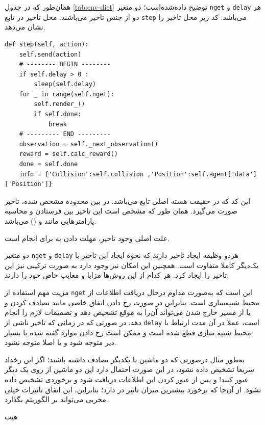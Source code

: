 همان‌طور که در جدول \ref{tab:env-dict} توضیح داده‌شده‌است؛ دو متغیر \texttt{nget} و  \texttt{delay} هر دو از جنس تاخیر می‌باشند. محل تاخیر در تابع \texttt{step} می‌باشد. کد زیر محل تاخیر را نشان می‌دهد.

\begin{latin}
\begin{lstlisting}
def step(self, action):	
	self.send(action)
	# -------- BEGIN --------
	if self.delay > 0 :
		sleep(self.delay)
	for _ in range(self.nget):
		self.render_()
		if self.done:
			break
	# --------- END -‌--------
	observation = self._next_observation()
	reward = self.calc_reward()
	done = self.done
	info = {'Collision':self.collision ,'Position':self.agent['data']['Position']}
\end{lstlisting}
\end{latin}

این کد که در حقیقت هسته اصلی
 تابع  می‌باشد. در بین محدوده مشخص شده، تاخیر صورت می‌گیرد. همان طور که مشخص است این تاخیر بین فرستادن  و محاسبه پارامتر‌هایی مانند  و ()
می‌باشد. 
\begin{note}
	علت اصلی وجود تاخیر، مهلت دادن به  برای انجام  است.
\end{note}

دو متغیر \texttt{nget} و \texttt{delay} هردو وظیفه ایجاد تاخیر دارند که نحوه ایجاد این تاخیر با یک‌دیگر کاملا متفاوت است. همچنین این امکان نیز وجود دارد به صورت ترکیبی نیز این تاخیر را ایجاد کرد. هر کدام از این روش‌ها مزایا و معایب خاص خود را دارند.

مزیت مهم استفاده از \texttt{nget} این است که به‌صورت مداوم در‌حال دریافت اطلاعات از محیط شبیه‌سازی است. بنابراین در صورت رخ دادن اتفاق خاصی مانند تصادف کردن و یا از مسیر خارج شدن می‌تواند آن‌را به موقع تشخیص دهد و تصمیمات لازم را انجام دهد.
در صورتی که در زمانی که تاخیر ناشی از \texttt{delay} است، عملا در آن مدت ارتباط با محیط شبیه سازی قطع شده است و ممکن است رخ دادن موارد گفته شده یا بسیار دیر متوجه شود و یا اصلا متوجه نشود. 

به‌طور مثال درصورتی که دو ماشین با یکدیگر تصادف داشته باشند؛ اگر این رخداد سریعا تشخیص داده نشود، در این صورت احتمال دارد این دو ماشین از روی یک دیگر عبور کنند! و پس از عبور کردن این اطلاعات دریافت شود و برخوردی تشخیص داده نشود. از آن‌جا که برخورد بیشترین میزان تاثیر در  دارد؛ بنابراین، این اتفاق تاثیرات خیلی مخربی می‌تواند بر الگوریتم بگذارد.

هیب

















